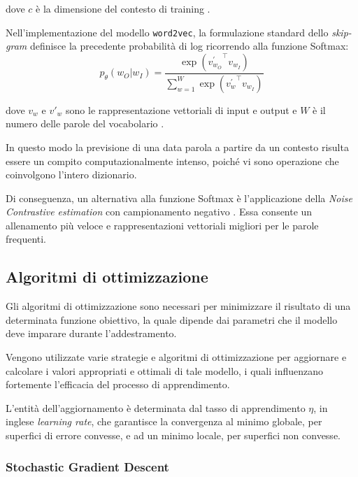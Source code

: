 dove $c$ è la dimensione del contesto di training \cite{mikolov2013distributed}. 

Nell'implementazione del modello \texttt{word2vec}, la formulazione standard dello \emph{skip-gram} definisce la precedente probabilità di log ricorrendo alla funzione Softmax:
\begin{equation}
p_{\theta}(w_{O} | w_{I}) = \frac{\exp({v^{\prime}_{w_{O}}}^{\top} v_{w_{I}})}{\sum_{w=1}^{W} \exp({v^{\prime}_{w}}^{\top} v_{w_I})}
\end{equation}

dove $v_w$ e $v'_w$ sono le rappresentazione vettoriali di input e output e $W$ è il numero delle parole del vocabolario \cite{dyer2014notes}.

In questo modo la previsione di una data parola a partire da un contesto risulta essere un compito computazionalmente intenso, poiché vi sono operazione che coinvolgono l'intero dizionario.

Di conseguenza, un alternativa alla funzione Softmax è l'applicazione della \emph{Noise Contrastive estimation} con campionamento negativo \cite{liu2016classification, viswesvaran2000measurement}. Essa consente un allenamento più veloce e rappresentazioni vettoriali migliori per le parole frequenti.

\subsection{Algoritmi di ottimizzazione}
\label{subsec:optimizer}

Gli algoritmi di ottimizzazione sono necessari per minimizzare il risultato di una determinata funzione obiettivo, la quale dipende dai parametri che il modello deve imparare durante l'addestramento. 

Vengono utilizzate varie strategie e algoritmi di ottimizzazione per aggiornare e calcolare i valori appropriati e ottimali di tale modello, i quali influenzano fortemente l'efficacia del processo di apprendimento.

L'entità dell'aggiornamento è determinata dal tasso di apprendimento $\eta$, in inglese \emph{learning rate}, che garantisce la convergenza al minimo globale, per superfici di errore convesse, e ad un minimo locale, per superfici non convesse. 

\subsubsection{Stochastic Gradient Descent}
\label{subsubsec:SGD}

